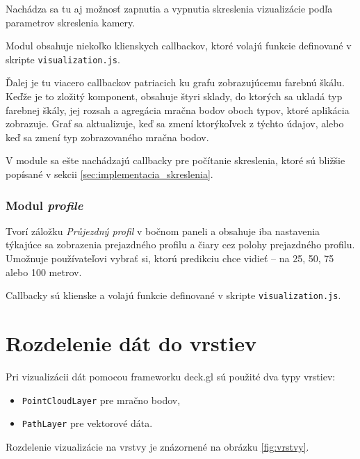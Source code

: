 Nachádza sa tu aj možnosť zapnutia a vypnutia skreslenia vizualizácie podľa parametrov skreslenia kamery.

Modul obsahuje niekoľko klienskych callbackov, ktoré volajú funkcie definované v skripte \texttt{visualization.js}.

Ďalej je tu viacero callbackov patriacich ku grafu zobrazujúcemu farebnú škálu. Keďže je to zložitý komponent, obsahuje štyri sklady, do ktorých sa ukladá typ farebnej škály, jej rozsah a agregácia mračna bodov oboch typov, ktoré aplikácia zobrazuje. Graf sa aktualizuje, keď sa zmení ktorýkoľvek z týchto údajov, alebo keď sa zmení typ zobrazovaného mračna bodov.

V module sa ešte nachádzajú callbacky pre počítanie skreslenia, ktoré sú bližšie popísané v sekcii \ref{sec:implementacia_skreslenia}.

\subsubsection{Modul \emph{profile} }

Tvorí záložku \emph{Průjezdný profil} v bočnom paneli a obsahuje iba nastavenia týkajúce sa zobrazenia prejazdného profilu a čiary cez polohy prejazdného profilu. Umožnuje používateľovi vybrať si, ktorú predikciu chce vidieť -- na 25, 50, 75 alebo 100 metrov.

Callbacky sú klienske a volajú funkcie definované v skripte \texttt{visualization.js}.

\section{Rozdelenie dát do vrstiev}
\label{sec:vrstvy}

Pri vizualizácii dát pomocou frameworku deck.gl sú použité dva typy vrstiev:
\begin{itemize}
    \item \texttt{PointCloudLayer} pre mračno bodov,
    \item \texttt{PathLayer} pre vektorové dáta.
\end{itemize}
Rozdelenie vizualizácie na vrstvy je znázornené na obrázku \ref{fig:vrstvy}.

